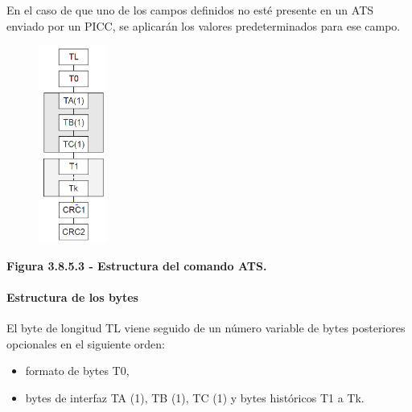 En el caso de que uno de los campos definidos no esté presente en un ATS enviado por un PICC, se aplicarán los valores predeterminados para ese campo.\par


\vspace{\baselineskip}



\begin{figure}[H]
	\begin{center}
		\includegraphics[width=0.88in,height=2.56in]{Norma_ISO/14443-4/media/image3.png}
    \end{center}
\end{figure}



\par

\begin{center}
\textbf{Figura 3.8.5.3 - Estructura del comando ATS.}
\end{center}
\par

\paragraph{Estructura de los bytes}
El byte de longitud TL viene seguido de un número variable de bytes posteriores opcionales en el siguiente orden:\par

\begin{itemize}
	\item formato de bytes T0,\par

	\item bytes de interfaz TA (1), TB (1), TC (1) y bytes históricos T1 a Tk.
\end{itemize}\par

